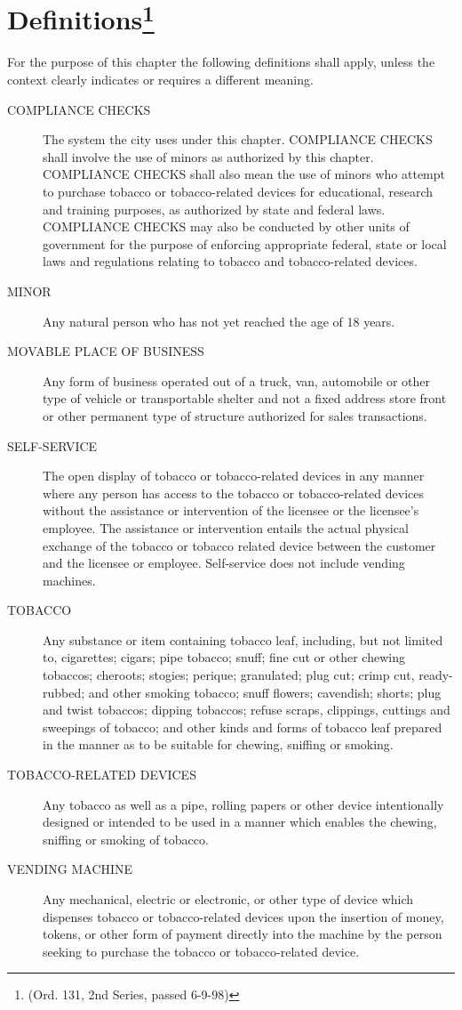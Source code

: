 \section{Definitions\footnote{(Ord. 131, 2nd Series, passed 6-9-98)}}
For the purpose of this chapter the following definitions shall apply, unless the context clearly indicates or requires a different meaning.
\begin{description}
    \item[COMPLIANCE CHECKS] The system the city uses under this chapter. COMPLIANCE CHECKS shall involve the use of minors as authorized by this chapter. COMPLIANCE CHECKS shall also mean the use of minors who attempt to purchase tobacco or tobacco-related devices for educational, research and training purposes, as authorized by state and federal laws. COMPLIANCE CHECKS may also be conducted by other units of government for the purpose of enforcing appropriate federal, state or local laws and regulations relating to tobacco and tobacco-related devices.
    \item[MINOR] Any natural person who has not yet reached the age of 18 years.
    \item[MOVABLE PLACE OF BUSINESS] Any form of business operated out of a truck, van, automobile or other type of vehicle or transportable shelter and not a fixed address store front or other permanent type of structure authorized for sales transactions.
    \item[SELF-SERVICE] The open display of tobacco or tobacco-related devices in any manner where any person has access to the tobacco or tobacco-related devices without the assistance or intervention of the licensee or the licensee’s employee.  The assistance or intervention entails the actual physical exchange of the tobacco or tobacco related device between the customer and the licensee or employee.  Self-service does not include vending machines.
    \item[TOBACCO] Any substance or item containing tobacco leaf, including, but not limited to, cigarettes; cigars; pipe tobacco; snuff; fine cut or other chewing tobaccos; cheroots; stogies; perique; granulated; plug cut; crimp cut, ready-rubbed; and other smoking tobacco; snuff flowers; cavendish; shorts; plug and twist tobaccos; dipping tobaccos; refuse scraps, clippings, cuttings and sweepings of tobacco; and other kinds and forms of tobacco leaf prepared in the manner as to be suitable for chewing, sniffing or smoking.
    \item[TOBACCO-RELATED DEVICES] Any tobacco as well as a pipe, rolling papers or other device intentionally designed or intended to be used in a manner which enables the chewing, sniffing or smoking of tobacco.
    \item[VENDING MACHINE] Any mechanical, electric or electronic, or other type of device which dispenses tobacco or tobacco-related devices upon the insertion of money, tokens, or other form of payment directly into the machine by the person seeking to purchase the tobacco or tobacco-related device.
\end{description}

